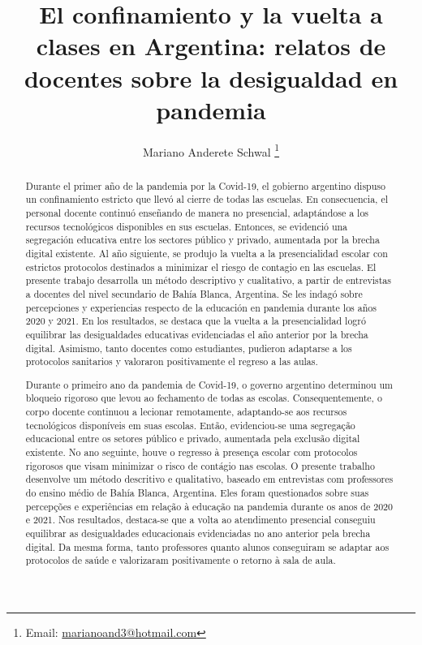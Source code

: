 \documentclass[spanish]{textolivre}
\title{El confinamiento y la vuelta a clases en Argentina: relatos de docentes sobre la desigualdad en pandemia}
\author[1]{Mariano Anderete Schwal \orcid{0000-0001-5275-3352} \thanks{Email: \url{marianoand3@hotmail.com}}}
\affil[1]{Universidad Nacional del Sur, Bahía Blanca, Buenos Aires, Argentina.}
\begin{document}
\maketitle

\begin{polyabstract}
\begin{abstract}
Durante el primer año de la pandemia por la Covid-19, el gobierno argentino dispuso un confinamiento estricto que llevó al cierre de todas las escuelas. En consecuencia, el personal docente continuó enseñando de manera no presencial, adaptándose a los recursos tecnológicos disponibles en sus escuelas. Entonces, se evidenció una segregación educativa entre los sectores público y privado, aumentada por la brecha digital existente. Al año siguiente, se produjo la vuelta a la presencialidad escolar con estrictos protocolos destinados a minimizar el riesgo de contagio en las escuelas. El presente trabajo desarrolla un método descriptivo y cualitativo, a partir de entrevistas a docentes del nivel secundario de Bahía Blanca, Argentina. Se les indagó sobre percepciones y experiencias respecto de la educación en pandemia durante los años 2020 y 2021. En los resultados, se destaca que la vuelta a la presencialidad logró equilibrar las desigualdades educativas evidenciadas el año anterior por la brecha digital. Asimismo, tanto docentes como estudiantes, pudieron adaptarse a los protocolos sanitarios y valoraron positivamente el regreso a las aulas.

\end{abstract}

\begin{portuguese}
\begin{abstract}
Durante o primeiro ano da pandemia de Covid-19, o governo argentino determinou um bloqueio rigoroso que levou ao fechamento de todas as escolas. Consequentemente, o corpo docente continuou a lecionar remotamente, adaptando-se aos recursos tecnológicos disponíveis em suas escolas. Então, evidenciou-se uma segregação educacional entre os setores público e privado, aumentada pela exclusão digital existente. No ano seguinte, houve o regresso à presença escolar com protocolos rigorosos que visam minimizar o risco de contágio nas escolas. O presente trabalho desenvolve um método descritivo e qualitativo, baseado em entrevistas com professores do ensino médio de Bahía Blanca, Argentina. Eles foram questionados sobre suas percepções e experiências em relação à educação na pandemia durante os anos de 2020 e 2021. Nos resultados, destaca-se que a volta ao atendimento presencial conseguiu equilibrar as desigualdades educacionais evidenciadas no ano anterior pela brecha digital. Da mesma forma, tanto professores quanto alunos conseguiram se adaptar aos protocolos de saúde e valorizaram positivamente o retorno à sala de aula.


\end{abstract}
\end{portuguese}
\end{polyabstract}
\end{document}
